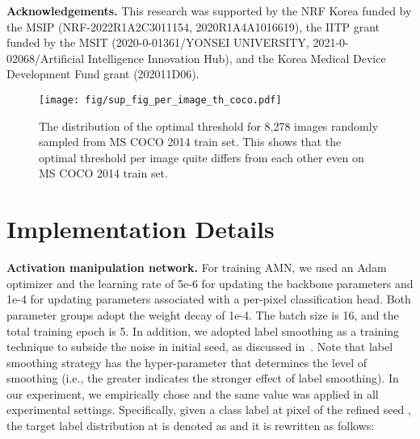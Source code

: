 \documentclass[10pt,twocolumn,letterpaper]{article}
\begin{document}
\noindent\textbf{Acknowledgements.} This research was supported by the NRF Korea funded by the MSIP (NRF-2022R1A2C3011154, 2020R1A4A1016619), the IITP grant funded by the MSIT (2020-0-01361/YONSEI UNIVERSITY, 2021-0-02068/Artificial Intelligence Innovation Hub), and the Korea Medical Device Development Fund grant (202011D06).  
{
    \clearpage
    \small
    
    
}

\clearpage

\appendix




\setcounter{table}{0}
\setcounter{figure}{0}
\renewcommand{\thetable}{A.\arabic{table}}
\renewcommand{\thefigure}{A.\arabic{figure}}

 \appendix
\setcounter{page}{1}
\begin{figure}[t]
\centering
\texttt{[image: fig/sup\_fig\_per\_image\_th\_coco.pdf]}
\vspace{-1mm}
\caption{The distribution of the optimal threshold for 8,278 images randomly sampled from MS COCO 2014 train set. This shows that the optimal threshold per image quite differs from each other even on MS COCO 2014 train set.}
\label{fig:sup_per_image_th_coco}
\vspace{-5mm}
\end{figure} 
\section{Implementation Details}
\noindent \textbf{Activation manipulation network.} For training AMN, we used an Adam~\cite{kingma2014adam} optimizer and the learning rate of 5e-6 for updating the backbone parameters and 1e-4 for updating parameters associated with a per-pixel classification head. Both parameter groups adopt the weight decay of 1e-4. The batch size is 16, and the total training epoch is 5. In addition, we adopted label smoothing as a training technique to subside the noise in initial seed, as discussed in~\cite{lukasik2020does}. Note that label smoothing strategy has the hyper-parameter  that determines the level of smoothing (i.e., the greater  indicates the stronger effect of label smoothing). In our experiment, we empirically chose   and the same value was applied in all experimental settings. Specifically, given a class label  at pixel  of the refined seed , the target label distribution at  is denoted as  and it is rewritten as follows:
\end{document}
